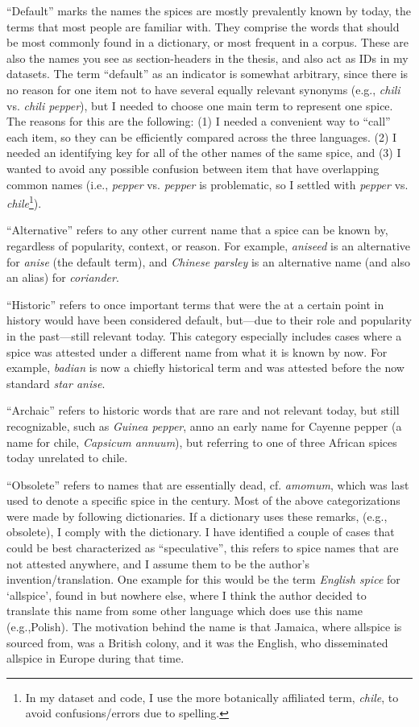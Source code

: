 ``Default'' marks the names the spices are mostly prevalently known by today, the terms that most people are familiar with. They comprise the words that should be most commonly found in a dictionary, or most frequent in a corpus. These are also the names you see as section-headers in the thesis, and also act as IDs in my datasets. The term ``default'' as an indicator is somewhat arbitrary, since there is no reason for one item not to have several equally relevant synonyms (e.g., \textit{chili} vs. \textit{chili pepper}), but I needed to choose one main term to represent one spice. The reasons for this are the following: (1) I needed a convenient way to ``call'' each item, so they can be efficiently compared across the three languages. (2) I needed an identifying key for all of the other names of the same spice, and (3) I wanted to avoid any possible confusion between item that have overlapping common names (i.e., \textit{pepper} vs. \textit{pepper} is problematic, so I settled with \textit{pepper} vs. \textit{chile}\footnote{In my dataset and code, I use the more botanically affiliated term, \textit{chile}, to avoid confusions/errors due to spelling.}).

``Alternative'' refers to any other current name that a spice can be known by, regardless of popularity, context, or reason. For example, \textit{aniseed} is an alternative for \textit{anise} (the default term), and \textit{Chinese parsley} is an alternative name (and also an alias) for \textit{coriander}.

``Historic'' refers to once important terms that were the at a certain point in history would have been considered default, but---due to their role and popularity in the past---still relevant today. This category especially includes cases where a spice was attested under a different name from what it is known by now. For example, \textit{badian} is now a chiefly historical term and was attested before the now standard \textit{star anise}.

``Archaic'' refers to historic words that are rare and not relevant today, but still recognizable, such as \textit{Guinea pepper}, anno an early name for Cayenne pepper (a name for chile, \textit{Capsicum annuum}), but referring to one of three African spices today unrelated to chile.

``Obsolete'' refers to names that are essentially dead, cf. \textit{amomum}, which was last used to denote a specific spice in the  century. Most of the above categorizations were made by following dictionaries. If a dictionary uses these remarks, (e.g., obsolete), I comply with the dictionary. 
I have identified a couple of cases that could be best characterized as ``speculative'', this refers to spice names that are not attested anywhere, and I assume them to be the author's invention/translation. 
One example for this would be the term \textit{English spice} for `allspice', found in \textcite[64]{raghavan_handbook_2007} but nowhere else, where I think the author decided to translate this name from some other language which does use this name (e.g.,Polish). The motivation behind the name is that Jamaica, where allspice is sourced from, was a British colony, and it was the English, who disseminated allspice in Europe during that time.

